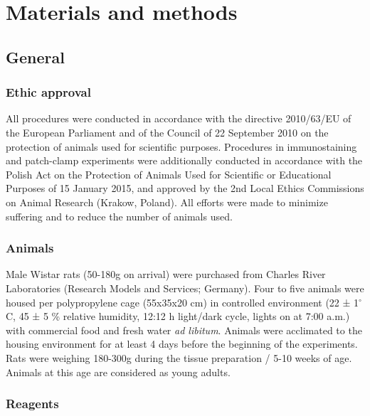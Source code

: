\documentclass[
]{article}
\author{}
\date{\vspace{-2.5em}}
\begin{document}
\hypertarget{materials-and-methods}{%
\section{Materials and methods}\label{materials-and-methods}}

\hypertarget{general}{%
\subsection{General}\label{general}}

\hypertarget{ethic-approval}{%
\subsubsection{Ethic approval}\label{ethic-approval}}

All procedures were conducted in accordance with the directive
2010/63/EU of the European Parliament and of the Council of 22 September
2010 on the protection of animals used for scientific purposes.
Procedures in immunostaining and patch-clamp experiments were
additionally conducted in accordance with the Polish Act on the
Protection of Animals Used for Scientific or Educational Purposes of 15
January 2015, and approved by the 2nd Local Ethics Commissions on Animal
Research (Krakow, Poland). All efforts were made to minimize suffering
and to reduce the number of animals used.

\hypertarget{animals}{%
\subsubsection{Animals}\label{animals}}

Male Wistar rats (50-180g on arrival) were purchased from Charles River
Laboratories (Research Models and Services; Germany). Four to five
animals were housed per polypropylene cage (55x35x20 cm) in controlled
environment (22 ± 1\(^{\circ}\)C, 45 ± 5 \% relative humidity, 12:12 h
light/dark cycle, lights on at 7:00 a.m.) with commercial food and fresh
water \emph{ad libitum}. Animals were acclimated to the housing
environment for at least 4 days before the beginning of the experiments.
Rats were weighing 180-300g during the tissue preparation / 5-10 weeks
of age. Animals at this age are considered as young adults.

\hypertarget{reagents}{%
\subsubsection{Reagents}\label{reagents}}
\end{document}

